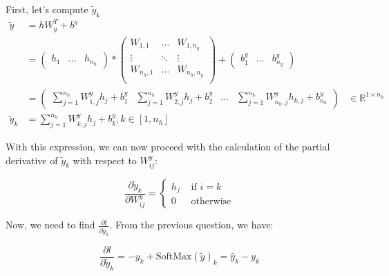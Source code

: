 \documentclass{article}
\theoremstyle{plain}%
\theoremstyle{definition}
\theoremstyle{remark}
\begin{document}
First, let's compute $ \tilde{y}_k $
\begin{align*}
    \tilde{y}   & = h W_y^T + b^y                                                                                                                                  \\
                & = \begin{pmatrix}
                        h_{1} & \dots & h_{n_h}
                    \end{pmatrix} * \begin{pmatrix}
                                        W_{1, 1}   & \dots  & W_{1, n_y}   \\
                                        \vdots     & \ddots & \vdots       \\
                                        W_{n_h, 1} & \dots  & W_{n_h, n_y} \\
                                    \end{pmatrix} + \begin{pmatrix}
                                                        b^y_1 & \dots & b^y_{n_y}
                                                    \end{pmatrix}                                                                                      \\
                & = \begin{pmatrix}
                        \sum_{j=1}^{n_h} W^y_{1,j} h_{j} + b^y_1 & \sum_{j=1}^{n_h} W^y_{2,j} h_{j} + b^y_2 & \dots & \sum_{j=1}^{n_h} W^y_{n_h,j} h_{k,j} + b^y_{n_h}
                    \end{pmatrix} & \in \mathbb{R}^{1 \times n_h} \\
    \tilde{y}_k & = \sum_{j=1}^{n_h} W^y_{k,j} h_{j} + b_k^y, k \in [1, n_h]
\end{align*}

With this expression, we can now proceed with the calculation of the partial derivative of \( \tilde{y}_k \) with respect to \( W^y_{ij} \):

\[
    \frac{\partial \tilde{y}_k }{\partial W^y_{ij}} = \begin{cases}
        h_j & \text{ if } i=k   \\
        0   & \text{ otherwise}
    \end{cases}
\]

Now, we need to find \( \frac{\partial l}{\partial \tilde{y}_k} \). From the previous question, we have:

\[
    \frac{\partial l}{\partial \tilde{y}_k} = -y_k + \text{SoftMax}(\tilde{y})_k = \hat{y}_k - y_k
\]
\end{document}
